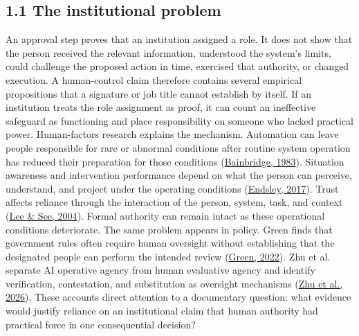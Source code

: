 \documentclass[11pt]{article}
\begin{document}
\subsection*{1.1 The institutional problem}
An approval step proves that an institution assigned a role. It does not show that the person received the relevant information, understood the system's limits, could challenge the proposed action in time, exercised that authority, or changed execution. A human-control claim therefore contains several empirical propositions that a signature or job title cannot establish by itself. If an institution treats the role assignment as proof, it can count an ineffective safeguard as functioning and place responsibility on someone who lacked practical power.
Human-factors research explains the mechanism. Automation can leave people responsible for rare or abnormal conditions after routine system operation has reduced their preparation for those conditions (\href{https://doi.org/10.1016/0005-1098(83)90046-8}{Bainbridge, 1983}). Situation awareness and intervention performance depend on what the person can perceive, understand, and project under the operating conditions (\href{https://doi.org/10.1177/0018720816681350}{Endsley, 2017}). Trust affects reliance through the interaction of the person, system, task, and context (\href{https://doi.org/10.1518/hfes.46.1.50_30392}{Lee \& See, 2004}). Formal authority can remain intact as these operational conditions deteriorate.
The same problem appears in policy. Green finds that government rules often require human oversight without establishing that the designated people can perform the intended review (\href{https://doi.org/10.1016/j.clsr.2022.105681}{Green, 2022}). Zhu et al. separate AI operative agency from human evaluative agency and identify verification, contestation, and substitution as oversight mechanisms (\href{https://doi.org/10.1007/s43681-026-01147-7}{Zhu et al., 2026}). These accounts direct attention to a documentary question: what evidence would justify reliance on an institutional claim that human authority had practical force in one consequential decision?
\end{document}
